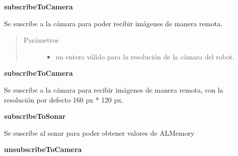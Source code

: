 \textbf{subscribeToCamera}
\label{\detokenize{dev_docs:subscribetocamera}}

\begin{fulllineitems}
\label{\detokenize{dev_docs:com.lar.cloudnao.Robot.subscribeToCamera(int)}}
Se suscribe a la cámara para poder recibir imágenes de manera remota.
\begin{quote}\begin{description}
\item[{Parámetros}] \leavevmode\begin{itemize}
\item {} 
 \textendash{} un entero válido para la resolución de la cámara del robot.

\end{itemize}

\end{description}\end{quote}

\end{fulllineitems}



\textbf{subscribeToCamera}
\label{\detokenize{dev_docs:id39}}

\begin{fulllineitems}
\label{\detokenize{dev_docs:com.lar.cloudnao.Robot.subscribeToCamera()}}
Se suscribe a la cámara para recibir imágenes de manera remota, con la resolución por defecto 160 px * 120 px.

\end{fulllineitems}



\textbf{subscribeToSonar}
\label{\detokenize{dev_docs:subscribetosonar}}

\begin{fulllineitems}
\label{\detokenize{dev_docs:com.lar.cloudnao.Robot.subscribeToSonar()}}
Se suscribe al sonar para poder obtener valores de ALMemory

\end{fulllineitems}



\textbf{unsubscribeToCamera}
\label{\detokenize{dev_docs:unsubscribetocamera}}

